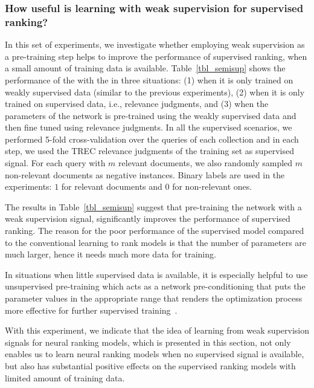 
\subsubsection{How useful is learning with weak supervision for supervised ranking?}
%
In this set of experiments, we investigate whether employing weak supervision as a pre-training step helps to improve the performance of supervised ranking, when a small amount of training data is available. Table~\ref{tbl_semisup} shows the performance of the \modelthree with the \feedthree in three situations: (1) when it is only trained on weakly supervised data (similar to the previous experiments), (2) when it is only trained on supervised data, i.e., relevance judgments, and (3) when the parameters of the network is pre-trained using the weakly supervised data and then fine tuned using relevance judgments.
%
In all the supervised scenarios, we performed 5-fold cross-\:validation over the queries of each collection and in each step, we used the TREC relevance judgments of the training set as supervised signal. For each query with $m$ relevant documents, we also randomly sampled $m$ non-relevant documents as negative instances. Binary labels are used in the experiments: $1$ for relevant documents and $0$ for non-relevant ones.

The results in Table~\ref{tbl_semisup} suggest that pre-training the network with a weak supervision signal, significantly improves the performance of supervised ranking.
%
The reason for the poor performance of the supervised model compared to the conventional learning to rank models is that the number of parameters are much larger, hence it needs much more data for training.

In situations when little supervised data is available, it is especially helpful to use unsupervised pre-training which acts as a network pre-conditioning that puts the parameter values in the appropriate range that renders the optimization process more effective for further supervised training~\citep{Rrhan:2010}.

With this experiment, we indicate that the idea of learning from weak supervision signals for neural ranking models, which is presented in this section, not only enables us to learn neural ranking models when no supervised signal is available, but also has substantial positive effects on the supervised ranking models with limited amount of training data. 